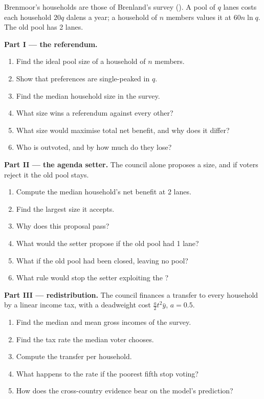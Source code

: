 \begin{problem}\label{pb:b3:public-choice-voting:pool}
Brenmoor's households are those of Brenland's survey (). A
pool of $q$ lanes costs each household $20q$ dalens a year; a household of $n$ members
values it at $60n\ln q$. The old pool has 2 lanes. %

\medskip\noindent\textbf{Part I --- the referendum.}
\begin{enumerate}
\item Find the ideal pool size of a household of $n$ members.
\item Show that preferences are single-peaked in $q$.
\item Find the median household size in the survey.
\item What size wins a referendum against every other?
\item What size would maximise total net benefit, and why does it differ?
\item Who is outvoted, and by how much do they lose?
\end{enumerate}

\medskip\noindent\textbf{Part II --- the agenda setter.} The council alone proposes a
size, and if voters reject it the old pool stays.
\begin{enumerate}[resume]
\item Compute the median household's net benefit at 2 lanes.
\item Find the largest size it accepts.
\item Why does this proposal pass?
\item What would the setter propose if the old pool had 1 lane?
\item What if the old pool had been closed, leaving no pool?
\item What rule would stop the setter exploiting the ?
\end{enumerate}

\medskip\noindent\textbf{Part III --- redistribution.} The council finances a
transfer to every household by a linear income tax, with a deadweight cost
$\tfrac a2t^2\bar y$, $a = 0.5$.
\begin{enumerate}[resume]
\item Find the median and mean gross incomes of the survey.
\item Find the tax rate the median voter chooses.
\item Compute the transfer per household.
\item What happens to the rate if the poorest fifth stop voting?
\item How does the cross-country evidence bear on the model's prediction?
\end{enumerate}


\end{problem}
